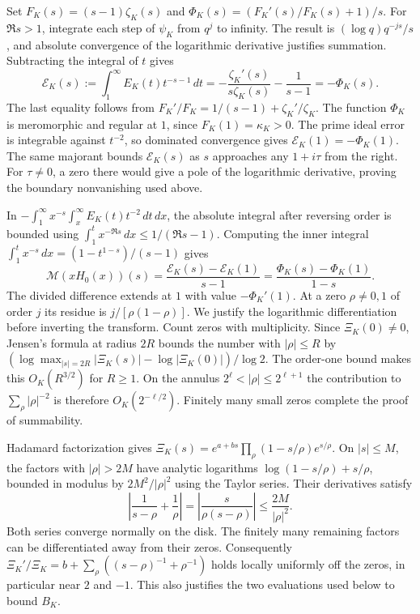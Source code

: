 \documentclass[11pt]{amsart}
\theoremstyle{definition}
\theoremstyle{remark}
\numberwithin{equation}{section}
\begin{document}
Set \(F_K(s)=(s-1)\zeta_K(s)\) and
\(\Phi_K(s)=(F_K'(s)/F_K(s)+1)/s\).
For \(\Re s>1\), integrate each step of \(\psi_K\) from \(q^j\)
to infinity. The result is \((\log q)q^{-js}/s\), and absolute
convergence of the logarithmic derivative justifies summation.
Subtracting the integral of \(t\) gives
\[
 \mathcal E_K(s):=\int_1^\infty E_K(t)t^{-s-1}\,dt
  =-\frac{\zeta_K'(s)}{s\zeta_K(s)}-\frac{1}{s-1}
  =-\Phi_K(s).
\]
The last equality follows from \(F_K'/F_K=1/(s-1)+\zeta_K'/\zeta_K\).
The function \(\Phi_K\) is meromorphic and regular at \(1\), since
\(F_K(1)=\kappa_K>0\). The prime ideal error is integrable against
\(t^{-2}\), so dominated convergence gives
\(\mathcal E_K(1)=-\Phi_K(1)\). The same majorant bounds
\(\mathcal E_K(s)\) as \(s\) approaches any \(1+i\tau\) from the
right. For \(\tau\ne0\), a zero there would give a pole of the
logarithmic derivative, proving the boundary nonvanishing used above.

In \(-\int_1^\infty x^{-s}\int_x^\infty E_K(t)t^{-2}\,dt\,dx\),
the absolute integral after reversing order is bounded using
\(\int_1^t x^{-\Re s}\,dx\leq1/(\Re s-1)\). Computing the inner
integral \(\int_1^t x^{-s}\,dx=(1-t^{1-s})/(s-1)\) gives
\begin{equation}\label{eq:dedekind-h0-transform}
 \mathcal{M}(xH_0(x))(s)
 =\frac{\mathcal E_K(s)-\mathcal E_K(1)}{s-1}
 =\frac{\Phi_K(s)-\Phi_K(1)}{1-s}.
\end{equation}
The divided difference extends at \(1\) with value
\(-\Phi_K'(1)\). At a zero \(\rho\ne0,1\) of order \(j\) its
residue is \(j/[\rho(1-\rho)]\).
We justify the logarithmic differentiation before inverting the
transform. Count zeros with multiplicity. Since \(\Xi_K(0)\ne0\),
Jensen's formula at radius \(2R\) bounds the number with
\(|\rho|\leq R\) by
\((\log \max_{|s|=2R}|\Xi_K(s)|-\log|\Xi_K(0)|)/\log 2\).
The order-one bound makes this \(O_K(R^{3/2})\) for \(R\ge1\).
On the annulus \(2^\ell<|\rho|\leq 2^{\ell+1}\) the contribution
to \(\sum_\rho|\rho|^{-2}\) is therefore \(O_K(2^{-\ell/2})\).
Finitely many small zeros complete the proof of summability.

Hadamard factorization gives
\(\Xi_K(s)=e^{a+bs}\prod_\rho(1-s/\rho)e^{s/\rho}\).
On \(|s|\leq M\), the factors with \(|\rho|>2M\) have analytic
logarithms \(\log(1-s/\rho)+s/\rho\), bounded in modulus by
\(2M^2/|\rho|^2\) using the Taylor series. Their derivatives
satisfy
\[
 \left|\frac1{s-\rho}+\frac1\rho\right|
 =\left|\frac{s}{\rho(s-\rho)}\right|\leq \frac{2M}{|\rho|^2}.
\]
Both series converge normally on the disk. The finitely many
remaining factors can be differentiated away from their zeros.
Consequently \(\Xi_K'/\Xi_K=b+\sum_\rho((s-\rho)^{-1}+\rho^{-1})\)
holds locally uniformly off the zeros, in particular near
\(2\) and \(-1\). This also justifies the two evaluations used
below to bound \(B_K\).
\end{document}
